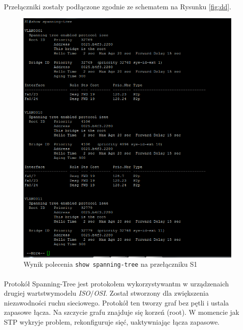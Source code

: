 \documentclass[wide,a4paper,titlepage,12pt] {article}
\begin{document}
  \paragraph{}
  Przełączniki zostały podłączone zgodnie ze schematem na Rysunku \ref{fig:dd}.

  \begin{figure}[H]
    \begin{center}
      \includegraphics[width=\textwidth]{img/t13.PNG}
      \caption{Wynik polecenia \texttt{show spanning-tree} na przełączniku S1}
    \end{center}
  \end{figure}

  \paragraph{}
  
  Protokół Spanning-Tree jest protokołem wykorzystywantm w urządzenaich drugiej wartstwymodelu \textit{ISO$/$OSI}. 
  Został stworzony dla zwiększenia niezawodności ruchu sieciowego. Protokół ten tworzy graf bez pętli i ustala zapasowe łącza.
  Na szczycie grafu znajduje się korzeń (root). W momencie jak STP wykryje problem, rekonfiguruje sięć, uaktywniając łącza zapasowe.
  
\end{document}
